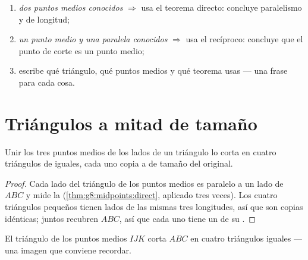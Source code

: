 \begin{method}\label{met:g8:midpoints:choose}
\begin{enumerate}
  \item \emph{dos puntos medios conocidos} $\Rightarrow$ usa el teorema
        directo: concluye paralelismo y  de longitud;
  \item \emph{un punto medio y una paralela conocidos} $\Rightarrow$ usa
        el recíproco: concluye que el punto de corte es un punto medio;
  \item escribe qué triángulo, qué puntos medios y qué teorema
        usas --- una frase para cada cosa.
\end{enumerate}
\end{method}

\section{Triángulos a mitad de tamaño}

\begin{proposition}\label{prop:g8:midpoints:medial}
Unir los tres puntos medios de los lados de un triángulo lo corta en
cuatro triángulos de  iguales, cada uno copia a  de tamaño del original.
\end{proposition}

\begin{proof}
Cada lado del triángulo de los puntos medios es paralelo a un lado de $ABC$ y mide la
 (\cref{thm:g8:midpoints:direct}, aplicado tres veces).
Los cuatro triángulos pequeños tienen lados de las mismas tres longitudes, así que
son copias idénticas; juntos recubren $ABC$, así que cada uno tiene un
 de su .
\end{proof}

\begin{omfigure}

{\small El triángulo de los puntos medios $IJK$ corta $ABC$ en cuatro triángulos
iguales --- una imagen que conviene recordar.}
\end{omfigure}

